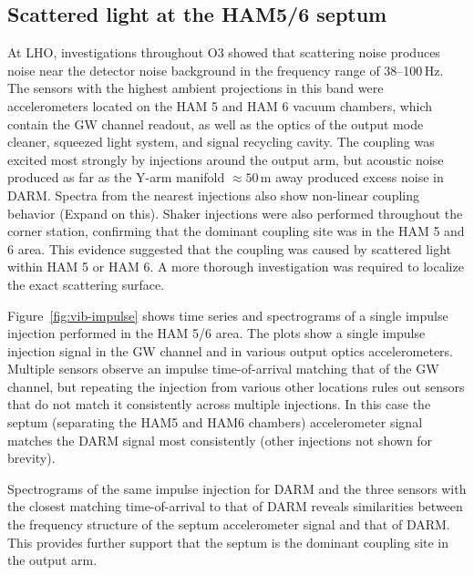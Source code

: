 \subsection{Scattered light at the HAM5/6 septum}\label{sec:vib-septum}

At \ac{LHO}, investigations throughout \ac{O3} showed that scattering noise produces noise near the detector noise background in the frequency range of 38--100\,Hz.
The sensors with the highest ambient projections in this band were accelerometers located on the HAM 5 and HAM 6 vacuum chambers, which contain the \ac{GW} channel readout, as well as the optics of the output mode cleaner, squeezed light system, and signal recycling cavity.
The coupling was excited most strongly by injections around the output arm, but acoustic noise produced as far as the Y-arm manifold $\approx 50$\,m away produced excess noise in \ac{DARM}.
Spectra from the nearest injections also show non-linear coupling behavior ({\color{red}Expand on this}).
Shaker injections were also performed throughout the corner station, confirming that the dominant coupling site was in the HAM 5 and 6 area.
This evidence suggested that the coupling was caused by scattered light within HAM 5 or HAM 6.
A more thorough investigation was required to localize the exact scattering surface.

Figure~\ref{fig:vib-impulse} shows time series and spectrograms of a single impulse injection performed in the \ac{HAM} 5/6 area.
The plots show a single impulse injection signal in the \ac{GW} channel and in various output optics accelerometers.
Multiple sensors observe an impulse time-of-arrival matching that of the \ac{GW} channel, but repeating the injection from various other locations rules out sensors that do not match it consistently across multiple injections.
In this case the septum (separating the HAM5 and HAM6 chambers) accelerometer signal matches the \ac{DARM} signal most consistently (other injections not shown for brevity).

Spectrograms of the same impulse injection for \ac{DARM} and the three sensors with the closest matching time-of-arrival to that of \ac{DARM} reveals similarities between the frequency structure of the septum accelerometer signal and that of \ac{DARM}.
This provides further support that the septum is the dominant coupling site in the output arm.

